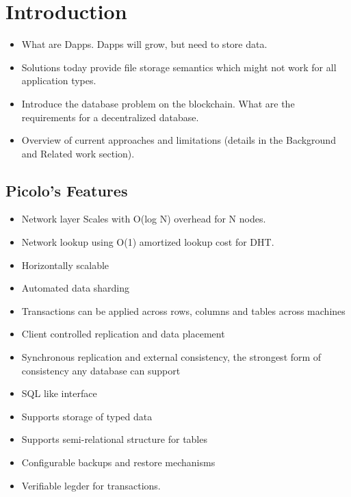 \documentclass[preprint,12pt]{elsarticle}
\begin{document}
\section{Introduction}\label{Sect:Introduction}


    \begin{itemize}
        \item What are Dapps. Dapps will grow, but need to store data.
        \item Solutions today provide file storage semantics which might not work for all application types.
        \item Introduce the database problem on the blockchain. What are the requirements for a decentralized database.
        \item Overview of current approaches and limitations (details in the Background and Related work section).
    \end{itemize}


\subsection{Picolo's Features}
\begin{itemize}
    \item Network layer Scales with O(log N) overhead for N nodes.
    \item Network lookup using O(1) amortized lookup cost for DHT.
    \item Horizontally scalable 
    \item Automated data sharding
    \item Transactions can be applied across rows, columns and tables across machines
    \item Client controlled replication and data placement
    \item Synchronous replication and external consistency, the strongest form of consistency any database can support
    \item SQL like interface
    \item Supports storage of typed data
    \item Supports semi-relational structure for tables
    \item Configurable backups and restore mechanisms
    \item Verifiable legder for transactions.
\end{itemize}

\end{document}
